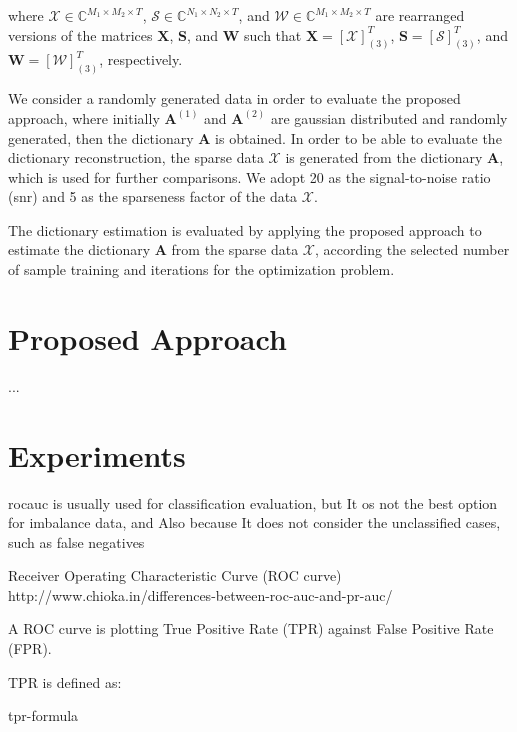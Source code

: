 where $\boldsymbol{\mathcal{X}} \in \mathbb{C}^{M_1 \times M_2 \times T}$, $\boldsymbol{\mathcal{S}} \in \mathbb{C}^{N_1 \times N_2 \times T}$, and $\boldsymbol{\mathcal{W}} \in \mathbb{C}^{M_1 \times M_2 \times T}$ are rearranged versions of the matrices $\boldsymbol{X}$, $\boldsymbol{S}$, and $\boldsymbol{W}$ such that $\boldsymbol{X} = [\boldsymbol{\mathcal{X}}]_{(3)}^T$, $\boldsymbol{S} = [\boldsymbol{\mathcal{S}}]_{(3)}^T$, and $\boldsymbol{W} = [\boldsymbol{\mathcal{W}}]_{(3)}^T$, respectively.

We consider a randomly generated data in order to evaluate the proposed approach, where initially $\boldsymbol{A}^{(1)}$ and $\boldsymbol{A}^{(2)}$ are gaussian distributed and randomly generated, then the dictionary $\boldsymbol{A}$ is obtained. In order to be able to evaluate the dictionary reconstruction, the sparse data $\boldsymbol{\mathcal{X}}$ is generated from the dictionary $\boldsymbol{A}$, which is used for further comparisons. We adopt 20 as the signal-to-noise ratio (snr) and 5 as the sparseness factor of the data $\boldsymbol{\mathcal{X}}$. 

The dictionary estimation is evaluated by applying the proposed approach to estimate the dictionary $\boldsymbol{A}$ from the sparse data $\boldsymbol{\mathcal{X}}$, according the selected number of sample training and iterations for the optimization problem.


\section{Proposed Approach}
\label{sec:4_proposal}

...

\section{Experiments}
\label{sec:4_experiments}

rocauc is usually used for classification evaluation, but It os not the best option for imbalance data, and Also because It does not consider the unclassified cases, such as false negatives

Receiver Operating Characteristic Curve (ROC curve) http://www.chioka.in/differences-between-roc-auc-and-pr-auc/

A ROC curve is plotting True Positive Rate (TPR) against False Positive Rate (FPR).

TPR is defined as:

tpr-formula

